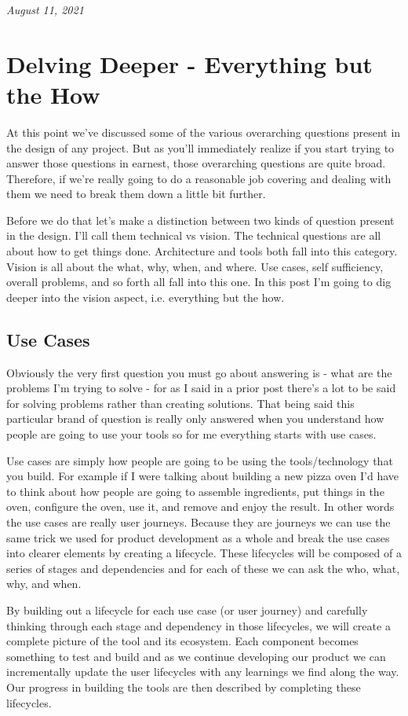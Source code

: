 \documentclass[10pt,a5paper]{book}
\begin{document}
\textit{August 11, 2021}

\section{Delving Deeper - Everything but the How}
At this point we've discussed some of the various overarching questions present in the design of any project. But as you'll immediately realize if you start trying to answer those questions in earnest, those overarching questions are quite broad. Therefore, if we're really going to do a reasonable job covering and dealing with them we need to break them down a little bit further. 

Before we do that let's make a distinction between two kinds of question present in the design. I'll call them technical vs vision. The technical questions are all about how to get things done. Architecture and tools both fall into this category. Vision is all about the what, why, when, and where. Use cases, self sufficiency, overall problems, and so forth all fall into this one. In this post I'm going to dig deeper into the vision aspect, i.e. everything but the how. 

\subsection{Use Cases}
Obviously the very first question you must go about answering is - what are the problems I'm trying to solve - for as I said in a prior post there's a lot to be said for solving problems rather than creating solutions. That being said this particular brand of question is really only answered when you understand how people are going to use your tools so for me everything starts with use cases. 

Use cases are simply how people are going to be using the tools/technology that you build. For example if I were talking about building a new pizza oven I'd have to think about how people are going to assemble ingredients, put things in the oven, configure the oven, use it, and remove and enjoy the result. In other words the use cases are really user journeys. Because they are journeys we can use the same trick we used for product development as a whole and break the use cases into clearer elements by creating a lifecycle. These lifecycles will be composed of a series of stages and dependencies and for each of these we can ask the who, what, why, and when.

By building out a lifecycle for each use case (or user journey) and carefully thinking through each stage and dependency in those lifecycles, we will create a complete picture of the tool and its ecosystem. Each component becomes something to test and build and as we continue developing our product we can incrementally update the user lifecycles with any learnings we find along the way. Our progress in building the tools are then described by completing these lifecycles. 
\end{document}
